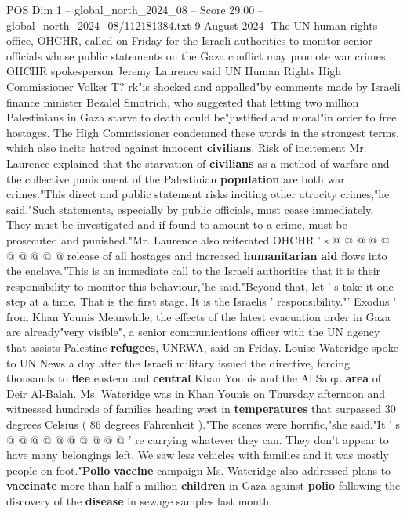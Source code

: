 \begin{textsample}{POS Dim 1 – global\_north\_2024\_08 – Score 29.00 – global\_north\_2024\_08/112181384.txt}  \label{ex:f1_pos_409}
9 August 2024- The UN human rights office, OHCHR, called on Friday for the Israeli authorities to monitor senior officials whose public statements on the Gaza conflict may promote war crimes.
OHCHR spokesperson Jeremy Laurence said UN Human Rights High Commissioner Volker T? rk"is shocked and appalled"by comments made by Israeli finance minister Bezalel Smotrich, who suggested that letting two million Palestinians in Gaza starve to death could be"justified and moral"in order to free hostages.
The High Commissioner condemned these words in the strongest terms, which also incite hatred against innocent \textbf{civilians}.
Risk of incitement Mr.
Laurence explained that the starvation of \textbf{civilians} as a method of warfare and the collective punishment of the Palestinian \textbf{population} are both war crimes."This direct and public statement risks inciting other atrocity crimes,"he said."Such statements, especially by public officials, must cease immediately.
They must be investigated and if found to amount to a crime, must be prosecuted and punished."Mr.
Laurence also reiterated OHCHR ' s @ @ @ @ @ @ @ @ @ @ release of all hostages and increased \textbf{humanitarian} \textbf{aid} flows into the enclave."This is an immediate call to the Israeli authorities that it is their responsibility to monitor this behaviour,"he said."Beyond that, let ' s take it one step at a time.
That is the first stage.
It is the Israelis ' responsibility."' Exodus ' from Khan Younis Meanwhile, the effects of the latest evacuation order in Gaza are already"very visible", a senior communications officer with the UN agency that assists Palestine \textbf{refugees}, UNRWA, said on Friday.
Louise Wateridge spoke to UN News a day after the Israeli military issued the directive, forcing thousands to \textbf{flee} eastern and \textbf{central} Khan Younis and the Al Salqa \textbf{area} of Deir Al-Balah.
Ms.
Wateridge was in Khan Younis on Thursday afternoon and witnessed hundreds of families heading west in \textbf{temperatures} that surpassed 30 degrees Celsius ( 86 degrees Fahrenheit )."The scenes were horrific,"she said."It ' s @ @ @ @ @ @ @ @ @ @ ' re carrying whatever they can.
They don't appear to have many belongings left.
We saw less vehicles with families and it was mostly people on foot."\textbf{Polio} \textbf{vaccine} campaign Ms.
Wateridge also addressed plans to \textbf{vaccinate} more than half a million \textbf{children} in Gaza against \textbf{polio} following the discovery of the \textbf{disease} in sewage samples last month.

\end{textsample}
